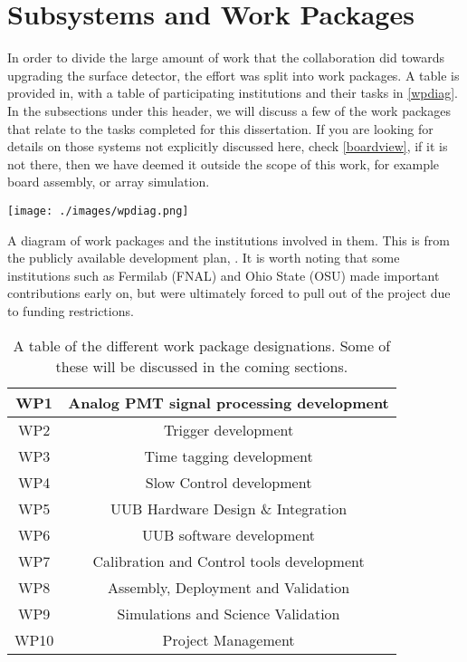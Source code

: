 \section{Subsystems and Work Packages}
In order to divide the large amount of work that the collaboration did towards upgrading the surface detector, the effort was split into work packages. A table is provided in, with a table of participating institutions and their tasks in \autoref{wpdiag}. In the subsections under this header, we will discuss a few of the work packages that relate to the tasks completed for this dissertation. If you are looking for details on those systems not explicitly discussed here, check \autoref{boardview}, if it is not there, then we have deemed it outside the scope of this work, for example board assembly, or array simulation.
\begin{table}[h!]
\centering
\texttt{[image: ./images/wpdiag.png]}
\caption[Auger Prime Institutions]{A diagram of work packages and the institutions involved in them. This is from the publicly available development plan, \textcite{devplan}. It is worth noting that some institutions such as Fermilab (FNAL) and Ohio State (OSU) made important contributions early on, but were ultimately forced to pull out of the project due to funding restrictions. }
\label{wpdiag}

\end{table}
\begin{table}[h!]
\centering
\begin{tabular}{|c|c|} \hline
WP1 & Analog PMT signal processing development \\ \hline
WP2 & Trigger development \\ \hline
WP3 & Time tagging development \\ \hline
WP4 & Slow Control development \\ \hline
WP5 & UUB Hardware Design \& Integration \\ \hline
WP6 & UUB software development \\ \hline
WP7 & Calibration and Control tools development \\ \hline
WP8 & Assembly, Deployment and Validation \\ \hline
WP9 & Simulations and Science Validation \\ \hline
WP10 & Project Management \\ \hline
\end{tabular}
\caption[Auger Work Packages]{A table of the different work package designations. Some of these will be discussed in the coming sections.}
\label{wptab}
\end{table}
